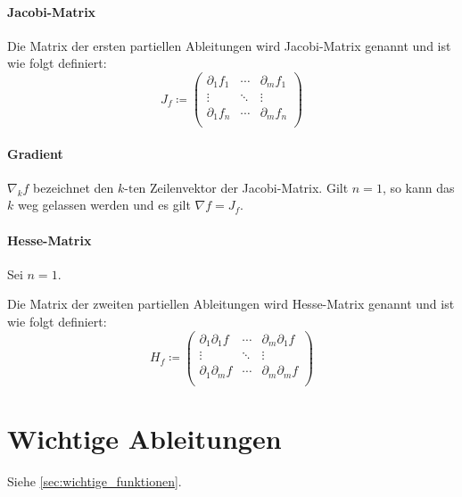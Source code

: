         \paragraph{Jacobi-Matrix}
            Die Matrix der ersten partiellen Ableitungen wird Jacobi-Matrix genannt und ist wie folgt definiert:
            \begin{equation*}
                J _ f \coloneqq
                \begin{pmatrix}
                    \partial _ 1 f _ 1 & \cdots & \partial _ m f _ 1 \\
                    \vdots & \ddots & \vdots \\
                    \partial _ 1 f _ n & \cdots & \partial _ m f _ n \\
                \end{pmatrix}
            \end{equation*}

        \paragraph{Gradient}
            $ \nabla _ k f $ bezeichnet den $ k\text{-ten} $ Zeilenvektor der Jacobi-Matrix. Gilt $ n = 1 $, so kann das $ k $ weg gelassen werden und es gilt $ \nabla f = J _ f $.

        \paragraph{Hesse-Matrix}
            Sei $ n = 1 $.

            Die Matrix der zweiten partiellen Ableitungen wird Hesse-Matrix genannt und ist wie folgt definiert:
            \begin{equation*}
                H _ f \coloneqq
                \begin{pmatrix}
                    \partial _ 1 \partial _ 1 f & \cdots & \partial _ m \partial _ 1 f \\
                    \vdots & \ddots & \vdots \\
                    \partial _ 1 \partial _ m f & \cdots & \partial _ m \partial _ m f \\
                \end{pmatrix}
            \end{equation*}

    \section{Wichtige Ableitungen}
        Siehe \ref{sec:wichtige_funktionen}.

